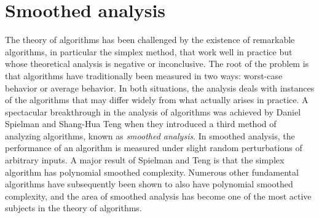 \documentclass{amsart}
\begin{document}
\section{Smoothed analysis}
The theory of algorithms has been challenged by the existence of
remarkable algorithms, in particular the simplex method, that work
well in practice but whose theoretical analysis is negative or
inconclusive. The root of the problem is that algorithms have
traditionally been measured in two ways: worst-case behavior or
average behavior. In both situations, the analysis deals with
instances of the algorithms that may differ widely from what actually
arises in practice. A spectacular breakthrough in the analysis of
algorithms was achieved by Daniel Spielman and Shang-Hua Teng 
when they introduced a third
method of analyzing algorithms, known as \emph{smoothed analysis}. In
smoothed analysis, the performance of an algorithm is measured under
slight random perturbations of arbitrary inputs. A major result of
Spielman and Teng is that the simplex algorithm has polynomial smoothed
complexity. Numerous other fundamental algorithms have subsequently
been shown to also have polynomial smoothed complexity, and the area
of smoothed analysis has become one of the most active subjects in the
theory of algorithms.
\end{document}
